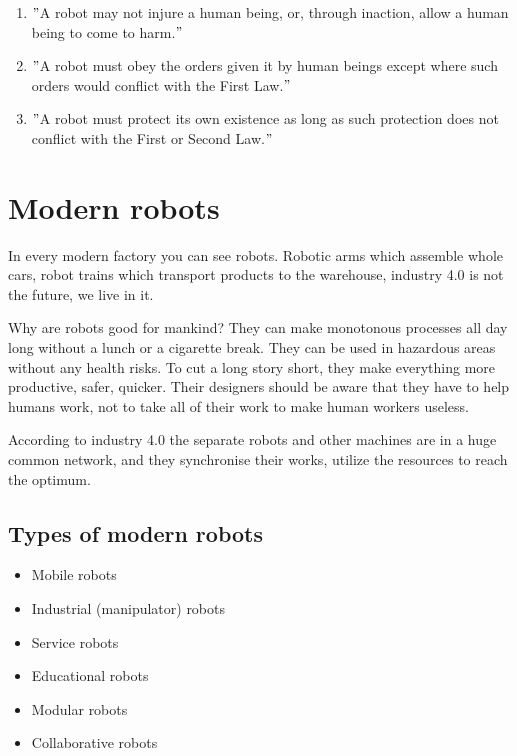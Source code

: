 		\begin{enumerate}
			\item $"$A robot may not injure a human being, or, through inaction, allow a human being to come to harm.$"$ \\
			\item $"$A robot must obey the orders given it by human beings except where such orders would conflict with the First Law.$"$ \\
			\item $"$A robot must protect its own existence as long as such protection does not conflict with the First or Second Law.$"$ \\
		\end{enumerate}

	\section{Modern robots}

		\hspace{15pt}In every modern factory you can see robots. Robotic arms which assemble whole cars, robot trains which transport products to the warehouse, industry 4.0 is not the future, we live in it. 

		Why are robots good for mankind? They can make monotonous processes all day long without a lunch or a cigarette break. They can be used in hazardous areas without any health risks. To cut a long story short, they make everything more productive, safer, quicker. Their designers should be aware that they have to help humans work, not to take all of their work to make human workers useless.

		According to industry 4.0 the separate robots and other machines are in a huge common network, and they synchronise their works, utilize the resources to reach the optimum.

		\subsection{Types of modern robots}

			\begin{itemize}
				\item Mobile robots 
				\item Industrial (manipulator) robots 
				\item Service robots 
				\item Educational robots 
				\item Modular robots 
				\item Collaborative robots 
			\end{itemize}
			
